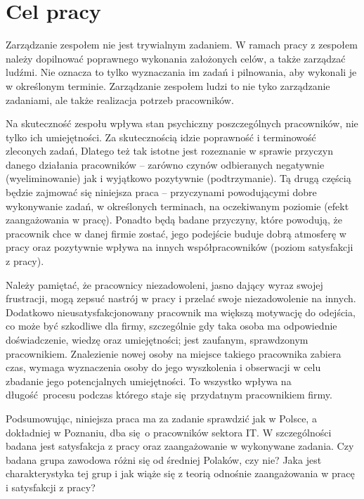 \chapter{Cel pracy}
Zarządzanie zespołem nie jest trywialnym zadaniem. W ramach pracy z zespołem należy dopilnować poprawnego wykonania założonych celów, a także zarządzać ludźmi. Nie oznacza to tylko wyznaczania im zadań i pilnowania, aby wykonali je w określonym terminie. Zarządzanie zespołem ludzi to nie tyko zarządzanie zadaniami, ale także realizacja potrzeb pracowników.

Na skuteczność zespołu wpływa stan psychiczny poszczególnych pracowników, nie tylko ich umiejętności. Za skutecznością idzie poprawność i terminowość zleconych zadań, Dlatego też tak istotne jest rozeznanie w sprawie przyczyn danego działania pracowników -- zarówno czynów odbieranych negatywnie (wyeliminowanie) jak i wyjątkowo pozytywnie (podtrzymanie). Tą drugą częścią będzie zajmować się niniejsza praca -- przyczynami powodującymi dobre wykonywanie zadań, w określonych terminach, na
oczekiwanym poziomie (efekt zaangażowania w pracę). Ponadto będą badane przyczyny, które powodują, że pracownik chce w danej firmie zostać, jego podejście buduje dobrą atmosferę w pracy oraz pozytywnie wpływa na innych współpracowników (poziom satysfakcji z pracy). 

Należy pamiętać, że pracownicy niezadowoleni, jasno dający wyraz swojej frustracji, mogą zepsuć nastrój w pracy i przelać swoje niezadowolenie na innych. Dodatkowo nieusatysfakcjonowany pracownik ma większą motywację do odejścia, co może być szkodliwe dla firmy, szczególnie gdy taka osoba ma odpowiednie doświadczenie, wiedzę oraz umiejętności; jest zaufanym, sprawdzonym pracownikiem. Znalezienie nowej osoby na miejsce takiego pracownika zabiera czas, wymaga
wyznaczenia osoby do jego wyszkolenia i obserwacji w celu zbadanie jego
potencjalnych umiejętności. To wszystko wpływa na długość procesu podczas którego staje się przydatnym pracownikiem firmy.

Podsumowując, niniejsza praca ma za zadanie sprawdzić jak w Polsce, a dokładniej w Poznaniu, dba się o pracowników sektora IT. W szczególności badana jest satysfakcja z pracy oraz zaangażowanie w wykonywane zadania. Czy badana grupa zawodowa różni się od średniej Polaków, czy nie? Jaka jest charakterystyka tej grup i jak wiąże się z teorią odnośnie zaangażowania w pracę i satysfakcji z pracy?

